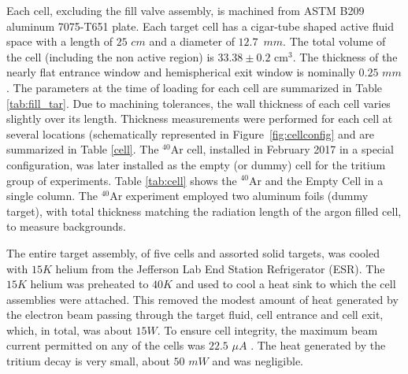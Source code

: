 \documentclass[final,5p,times,twocolumn]{elsarticle}
\begin{document}
Each cell, excluding the fill valve assembly, is machined from ASTM B209 aluminum 7075-T651 plate. Each target cell has a cigar-tube shaped active fluid space with a length of $25$ $cm$ and a diameter of $12.7$~$mm$. The total volume of the cell (including the non active region) is $33.38 \pm 0.2$ cm$^{3}$. The thickness of the nearly flat entrance window and hemispherical exit window is nominally $0.25$ $mm$. The parameters at the time of loading for each cell are summarized in Table \ref{tab:fill_tar}. Due to machining tolerances, the wall thickness of each cell varies slightly over its length. Thickness measurements were performed for each cell at several locations (schematically represented in Figure~\ref{fig:cellconfig} and are summarized in Table \ref{cell}. The $^{40}$Ar cell, installed in February 2017 in a special configuration, was later installed as the empty (or dummy) cell for the tritium group of experiments. Table \ref{tab:cell} shows the $^{40}$Ar and the Empty Cell in a single column. The $^{40}$Ar experiment employed two aluminum foils (dummy target), with total thickness matching the radiation length of the argon filled cell, to measure backgrounds.

The entire target assembly, of five cells and assorted solid targets, was cooled with $15K$ helium from the Jefferson Lab End Station Refrigerator (ESR). The $15K$ helium was preheated to $40K$ and used to cool a heat sink to which the cell assemblies were attached. This removed the modest amount of heat generated by the electron beam passing through the target fluid, cell entrance and cell exit, which, in total, was about $15W$. To ensure cell integrity, the maximum beam current permitted on any of the cells was $22.5$ $\mu A$ \cite{engreport}. The heat generated by the tritium decay is very small, about $50$ $mW$ and was negligible.

\end{document}
